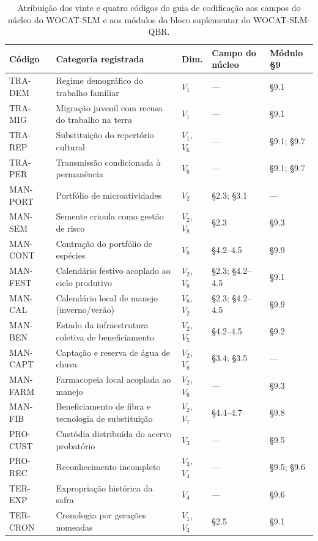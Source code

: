 \documentclass[preprint,authoryear,12pt]{elsarticle}
\begin{document}
\begin{table}[H]
\centering
\caption{Atribuição dos vinte e quatro códigos do guia de codificação aos campos do núcleo do WOCAT-SLM e aos módulos do bloco suplementar do WOCAT-SLM-QBR.}
\label{tab:mapeamento_codigos}
\footnotesize
\setlength{\tabcolsep}{4pt}
\begin{tabular}{p{1.9cm}p{5.0cm}p{1.3cm}p{2.6cm}p{2.4cm}}
\toprule
\textbf{Código} & \textbf{Categoria registrada} & \textbf{Dim.} & \textbf{Campo do núcleo} & \textbf{Módulo §9} \\
\midrule
TRA-DEM & Regime demográfico do trabalho familiar & $V_1$ & --- & §9.1 \\
TRA-MIG & Migração juvenil com recusa do trabalho na terra & $V_1$ & --- & §9.1 \\
TRA-REP & Substituição do repertório cultural & $V_1$, $V_6$ & --- & §9.1; §9.7 \\
TRA-PER & Transmissão condicionada à permanência & $V_6$ & --- & §9.1; §9.7 \\
\addlinespace
MAN-PORT & Portfólio de microatividades & $V_2$ & §2.3; §3.1 & --- \\
MAN-SEM & Semente crioula como gestão de risco & $V_2$, $V_8$ & §2.3 & §9.3 \\
MAN-CONT & Contração do portfólio de espécies & $V_8$ & §4.2--4.5 & §9.9 \\
MAN-FEST & Calendário festivo acoplado ao ciclo produtivo & $V_2$, $V_8$ & §2.3; §4.2--4.5 & §9.1 \\
MAN-CAL & Calendário local de manejo (inverno/verão) & $V_8$, $V_2$ & §2.3; §4.2--4.5 & §9.9 \\
MAN-BEN & Estado da infraestrutura coletiva de beneficiamento & $V_2$, $V_5$ & §4.2--4.5 & §9.2 \\
MAN-CAPT & Captação e reserva de água de chuva & $V_2$, $V_8$ & §3.4; §3.5 & --- \\
MAN-FARM & Farmacopeia local acoplada ao manejo & $V_2$, $V_6$ & --- & §9.3 \\
MAN-FIB & Beneficiamento de fibra e tecnologia de substituição & $V_2$, $V_7$ & §4.4--4.7 & §9.8 \\
\addlinespace
PRO-CUST & Custódia distribuída do acervo probatório & $V_3$ & --- & §9.5 \\
PRO-REC & Reconhecimento incompleto & $V_3$, $V_4$ & --- & §9.5; §9.6 \\
\addlinespace
TER-EXP & Expropriação histórica da safra & $V_4$ & --- & §9.6 \\
TER-CRON & Cronologia por gerações nomeadas & $V_1$, $V_3$ & §2.5 & §9.1 \\

\end{tabular}
\end{table}
\end{document}
